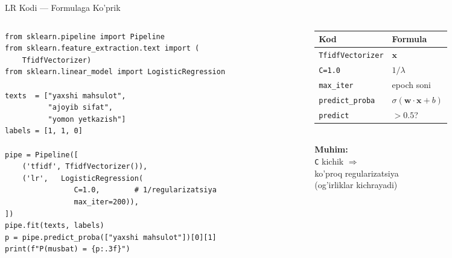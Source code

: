 \documentclass[aspectratio=169,11pt]{beamer}
\begin{document}
\begin{frame}[fragile]{LR Kodi --- Formulaga Ko'prik}
  \begin{columns}[T]
    \begin{column}{0.58\textwidth}
\begin{lstlisting}
from sklearn.pipeline import Pipeline
from sklearn.feature_extraction.text import (
    TfidfVectorizer)
from sklearn.linear_model import LogisticRegression

texts  = ["yaxshi mahsulot",
          "ajoyib sifat",
          "yomon yetkazish"]
labels = [1, 1, 0]

pipe = Pipeline([
    ('tfidf', TfidfVectorizer()),
    ('lr',   LogisticRegression(
                C=1.0,        # 1/regularizatsiya
                max_iter=200)),
])
pipe.fit(texts, labels)
p = pipe.predict_proba(["yaxshi mahsulot"])[0][1]
print(f"P(musbat) = {p:.3f}")
\end{lstlisting}
    \end{column}
    \begin{column}{0.39\textwidth}
      \small
      \begin{tabular}{@{}ll@{}}
        \toprule
        Kod & Formula \\
        \midrule
        \texttt{TfidfVectorizer} & $\mathbf{x}$ \\
        \texttt{C=1.0}           & $1/\lambda$ \\
        \texttt{max\_iter}       & epoch soni \\
        \texttt{predict\_proba}  & $\sigma(\mathbf{w}\cdot\mathbf{x}+b)$ \\
        \texttt{predict}         & $>0.5$? \\
        \bottomrule
      \end{tabular}
      \vspace{6pt}\\
      \small\textbf{Muhim:}\\
      \texttt{C} kichik $\Rightarrow$\\
      ko'proq regularizatsiya\\
      (og'irliklar kichrayadi)
    \end{column}
  \end{columns}
\end{frame}
\end{document}
